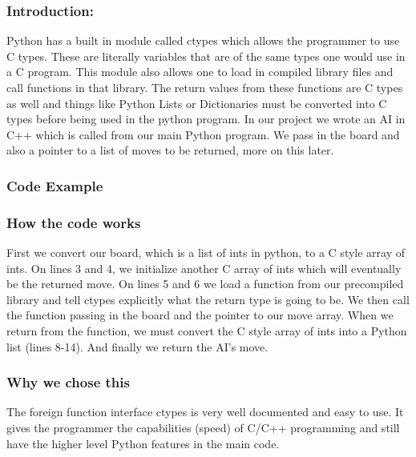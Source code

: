\documentclass[12pt]{article}
\begin{document}
        \subsubsection{Introduction:}
            Python has a built in module called ctypes which allows the programmer
            to use C types. These are literally variables that are of the same types
            one would use in a C program. This module also allows one to load in compiled
            library files and call functions in that library. The return values from these
            functions are C types as well and things like Python Lists or Dictionaries must
            be converted into C types before being used in the python program. In our project
            we wrote an AI in C++ which is called from our main Python program. We pass in
            the board and also a pointer to a list of moves to be returned, more on this
            later.
        \subsubsection{Code Example}
            
        \subsubsection{How the code works}
            First we convert our board, which is a list of ints in python, to a C style array
            of ints. On lines 3 and 4, we initialize another C array of ints which will eventually
            be the returned move. On lines 5 and 6 we load a function from our precompiled library
            and tell ctypes explicitly what the return type is going to be. We then call the function
            passing in the board and the pointer to our move array. When we return from the function,
            we must convert the C style array of ints into a Python list (lines 8-14). And finally
            we return the AI's move.
        \subsubsection{Why we chose this}
            The foreign function interface ctypes is very well documented and easy to use.
            It gives the programmer the capabilities (speed) of C/C++ programming
            and still have the higher level Python features in the main code.
\end{document}
